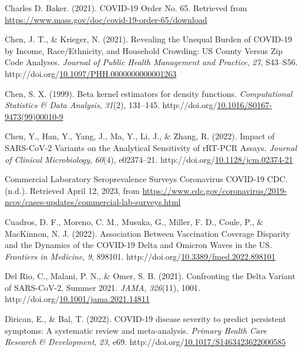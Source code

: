 \documentclass[12pt,twoside]{smiththesis}
\newlength{\cslhangindent}
\newenvironment{CSLReferences}[2] %
 {%
\setlength{\parindent}{0pt}
\ifodd #1 \everypar{\setlength{\hangindent}{\cslhangindent}}\ignorespaces\fi
\ifnum #2 > 0
\setlength{\parskip}{#2\baselineskip}
  \fi
}%
{}
\begin{document}
\begin{CSLReferences}{1}{0}
\leavevmode{}%
Charles D. Baker. (2021). {COVID-19 Order No}. 65. Retrieved from \url{https://www.mass.gov/doc/covid-19-order-65/download}

\leavevmode{}%
Chen, J. T., \& Krieger, N. (2021). Revealing the {Unequal Burden} of {COVID-19} by {Income}, {Race}/{Ethnicity}, and {Household Crowding}: {US County Versus Zip Code Analyses}. \emph{Journal of Public Health Management and Practice}, \emph{27}, S43--S56. http://doi.org/\href{https://doi.org/10.1097/PHH.0000000000001263}{10.1097/PHH.0000000000001263}

\leavevmode{}%
Chen, S. X. (1999). Beta kernel estimators for density functions. \emph{Computational Statistics \& Data Analysis}, \emph{31}(2), 131--145. http://doi.org/\href{https://doi.org/10.1016/S0167-9473(99)00010-9}{10.1016/S0167-9473(99)00010-9}

\leavevmode{}%
Chen, Y., Han, Y., Yang, J., Ma, Y., Li, J., \& Zhang, R. (2022). Impact of {SARS-CoV-2 Variants} on the {Analytical Sensitivity} of {rRT-PCR Assays}. \emph{Journal of Clinical Microbiology}, \emph{60}(4), e02374--21. http://doi.org/\href{https://doi.org/10.1128/jcm.02374-21}{10.1128/jcm.02374-21}

\leavevmode{}%
Commercial {Laboratory Seroprevalence Surveys} \textbar{} {Coronavirus} \textbar{} {COVID-19} \textbar{} {CDC}. (n.d.). Retrieved April 12, 2023, from \url{https://www.cdc.gov/coronavirus/2019-ncov/cases-updates/commercial-lab-surveys.html}

\leavevmode{}%
Cuadros, D. F., Moreno, C. M., Musuka, G., Miller, F. D., Coule, P., \& MacKinnon, N. J. (2022). Association {Between Vaccination Coverage Disparity} and the {Dynamics} of the {COVID-19 Delta} and {Omicron Waves} in the {US}. \emph{Frontiers in Medicine}, \emph{9}, 898101. http://doi.org/\href{https://doi.org/10.3389/fmed.2022.898101}{10.3389/fmed.2022.898101}

\leavevmode{}%
Del Rio, C., Malani, P. N., \& Omer, S. B. (2021). Confronting the {Delta Variant} of {SARS-CoV-2}, {Summer} 2021. \emph{JAMA}, \emph{326}(11), 1001. http://doi.org/\href{https://doi.org/10.1001/jama.2021.14811}{10.1001/jama.2021.14811}

\leavevmode{}%
Dirican, E., \& Bal, T. (2022). {COVID-19} disease severity to predict persistent symptoms: A systematic review and meta-analysis. \emph{Primary Health Care Research \& Development}, \emph{23}, e69. http://doi.org/\href{https://doi.org/10.1017/S1463423622000585}{10.1017/S1463423622000585}


\end{CSLReferences}
\end{document}
